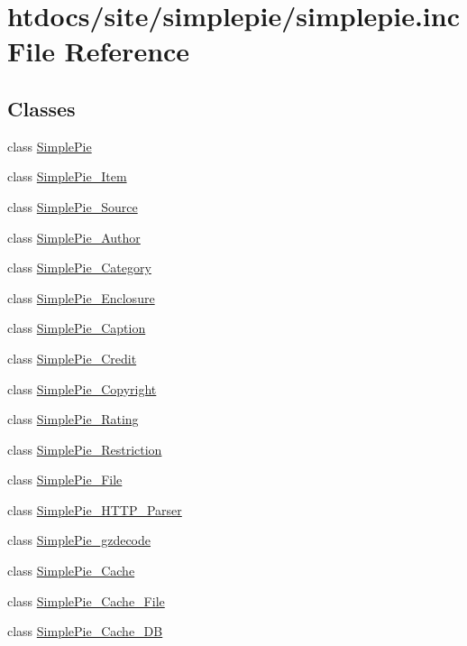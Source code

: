 \hypertarget{simplepie_8inc}{\section{htdocs/site/simplepie/simplepie.inc File Reference}
\label{simplepie_8inc}
}
\subsection*{Classes}
\begin{DoxyCompactItemize}
\item 
class \hyperlink{class_simple_pie}{Simple\-Pie}
\item 
class \hyperlink{class_simple_pie___item}{Simple\-Pie\-\_\-\-Item}
\item 
class \hyperlink{class_simple_pie___source}{Simple\-Pie\-\_\-\-Source}
\item 
class \hyperlink{class_simple_pie___author}{Simple\-Pie\-\_\-\-Author}
\item 
class \hyperlink{class_simple_pie___category}{Simple\-Pie\-\_\-\-Category}
\item 
class \hyperlink{class_simple_pie___enclosure}{Simple\-Pie\-\_\-\-Enclosure}
\item 
class \hyperlink{class_simple_pie___caption}{Simple\-Pie\-\_\-\-Caption}
\item 
class \hyperlink{class_simple_pie___credit}{Simple\-Pie\-\_\-\-Credit}
\item 
class \hyperlink{class_simple_pie___copyright}{Simple\-Pie\-\_\-\-Copyright}
\item 
class \hyperlink{class_simple_pie___rating}{Simple\-Pie\-\_\-\-Rating}
\item 
class \hyperlink{class_simple_pie___restriction}{Simple\-Pie\-\_\-\-Restriction}
\item 
class \hyperlink{class_simple_pie___file}{Simple\-Pie\-\_\-\-File}
\item 
class \hyperlink{class_simple_pie___h_t_t_p___parser}{Simple\-Pie\-\_\-\-H\-T\-T\-P\-\_\-\-Parser}
\item 
class \hyperlink{class_simple_pie__gzdecode}{Simple\-Pie\-\_\-gzdecode}
\item 
class \hyperlink{class_simple_pie___cache}{Simple\-Pie\-\_\-\-Cache}
\item 
class \hyperlink{class_simple_pie___cache___file}{Simple\-Pie\-\_\-\-Cache\-\_\-\-File}
\item 
class \hyperlink{class_simple_pie___cache___d_b}{Simple\-Pie\-\_\-\-Cache\-\_\-\-D\-B}

\end{DoxyCompactItemize}
